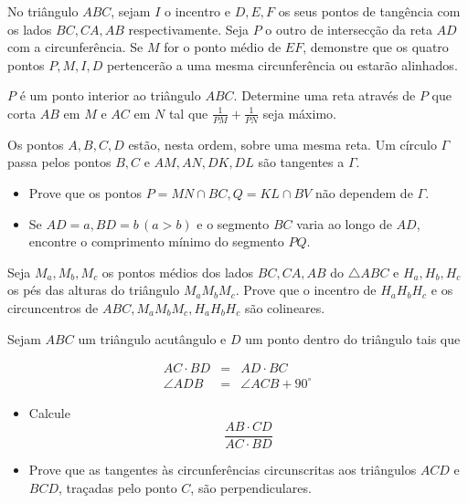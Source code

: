 \begin{questao}
  No triângulo $ABC$, sejam $I$ o incentro e $D,E,F$
  os seus pontos de tangência com os lados $BC,CA,AB$
  respectivamente. Seja $P$ o outro de intersecção da reta $AD$
  com a circunferência. Se $M$ for o ponto médio de $EF$,
  demonstre que os quatro pontos $P,M,I,D$ pertencerão a uma mesma
  circunferência ou estarão alinhados.
\end{questao}

\begin{questao}
  $P$ é um ponto interior ao triângulo $ABC$. Determine
  uma reta através de $P$ que corta $AB$ em $M$ e $AC$ em
  $N$ tal que $\frac{1}{PM}+\frac{1}{PN}$ seja máximo.
\end{questao}

\begin{questao}
  Os pontos $A,B,C,D$ estão, nesta ordem, sobre uma mesma
  reta. Um círculo $\Gamma$ passa pelos pontos $B,C$ e
  $AM,AN,DK,DL$ são tangentes a $\Gamma$.
  \begin{itemize}
    \item Prove que os pontos $P=MN \cap BC,Q=KL \cap BV$ não
    dependem de $\Gamma$.

    \item Se $AD=a,BD=b\, (a>b)$ e o segmento $BC$ varia ao longo
    de $AD$, encontre o comprimento mínimo do segmento $PQ$.
  \end{itemize}
\end{questao}

\begin{questao}
  Seja $M_a,M_b,M_c$ os pontos médios dos lados
  $BC,CA,AB$ do $\triangle ABC$ e $H_a,H_b,H_c$ os pés das
  alturas do triângulo $M_aM_bM_c$. Prove que o incentro de
  $H_aH_bH_c$ e os circuncentros de $ABC,M_aM_bM_c,H_aH_bH_c$ são
  colineares.
\end{questao}

\begin{questao}
  Sejam $ABC$ um triângulo acutângulo e $D$ um ponto
  dentro do triângulo tais que

  \begin{eqnarray*}
    AC \cdot BD & = & AD \cdot BC \\
    \angle ADB & = & \angle ACB + 90^\circ
  \end{eqnarray*}

  \begin{itemize}
    \item Calcule $$ \frac{AB \cdot CD}{AC \cdot BD} $$

    \item Prove que as tangentes às circunferências circunscritas aos
    triângulos $ACD$ e $BCD$, traçadas pelo ponto $C$, são
    perpendiculares.
  \end{itemize}
\end{questao}

